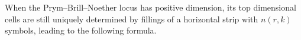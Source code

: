 \documentclass[11pt,reqno]{amsart}
\theoremstyle{definition}
\theoremstyle{problem}
\theoremstyle{plain}
\newtheorem{proposition}[definition]{Proposition}
\theoremstyle{remark}
\theoremstyle{theorem}
\numberwithin{equation}{section}
\numberwithin{figure}{section}
\begin{document}
%
%
%
%  
%
%  
%  


When the Prym--Brill--Noether locus has positive dimension, its top dimensional cells are still uniquely determined by fillings of a horizontal strip with $n(r,k)$ symbols, leading to the following formula.  


\end{document}
